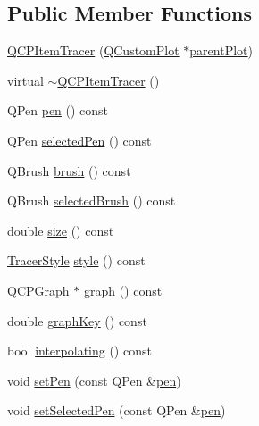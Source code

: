 \subsection*{Public Member Functions}
\begin{DoxyCompactItemize}
\item 
\mbox{\hyperlink{class_q_c_p_item_tracer_adc5ca846eeac323db4aa1fc4081e36be}{Q\+C\+P\+Item\+Tracer}} (\mbox{\hyperlink{class_q_custom_plot}{Q\+Custom\+Plot}} $\ast$\mbox{\hyperlink{class_q_c_p_layerable_a473edb813a4c1929d6b6a8fe3ff3faf7}{parent\+Plot}})
\item 
virtual \mbox{\hyperlink{class_q_c_p_item_tracer_a43686565a9b70815915618636b9bdf0f}{$\sim$\+Q\+C\+P\+Item\+Tracer}} ()
\item 
Q\+Pen \mbox{\hyperlink{class_q_c_p_item_tracer_a789cdc627868f5a4a0956816072571c9}{pen}} () const
\item 
Q\+Pen \mbox{\hyperlink{class_q_c_p_item_tracer_ad231a97bac99e01778618d1a5720b17d}{selected\+Pen}} () const
\item 
Q\+Brush \mbox{\hyperlink{class_q_c_p_item_tracer_a6dd4660e70f58bb00390bcda56be568d}{brush}} () const
\item 
Q\+Brush \mbox{\hyperlink{class_q_c_p_item_tracer_ae3e48270b4a6ec20f7a9e1f63e778243}{selected\+Brush}} () const
\item 
double \mbox{\hyperlink{class_q_c_p_item_tracer_a4e42d7b49f293273a74a49a2457856e2}{size}} () const
\item 
\mbox{\hyperlink{class_q_c_p_item_tracer_a2f05ddb13978036f902ca3ab47076500}{Tracer\+Style}} \mbox{\hyperlink{class_q_c_p_item_tracer_afdaee32c9ccc9c14502b28d3d86bf5ed}{style}} () const
\item 
\mbox{\hyperlink{class_q_c_p_graph}{Q\+C\+P\+Graph}} $\ast$ \mbox{\hyperlink{class_q_c_p_item_tracer_ac6526e3e1fff79894f034823461b138a}{graph}} () const
\item 
double \mbox{\hyperlink{class_q_c_p_item_tracer_ac39a0791109588d11bb97cd643da2470}{graph\+Key}} () const
\item 
bool \mbox{\hyperlink{class_q_c_p_item_tracer_ae9ab6d72e0a35e1769c0b5a9b58181f2}{interpolating}} () const
\item 
void \mbox{\hyperlink{class_q_c_p_item_tracer_af8048636fc1ef0152e51809b008df2ca}{set\+Pen}} (const Q\+Pen \&\mbox{\hyperlink{class_q_c_p_item_tracer_a789cdc627868f5a4a0956816072571c9}{pen}})
\item 
void \mbox{\hyperlink{class_q_c_p_item_tracer_ae1bf70db7f13f928660168cd3e5069f3}{set\+Selected\+Pen}} (const Q\+Pen \&\mbox{\hyperlink{class_q_c_p_item_tracer_a789cdc627868f5a4a0956816072571c9}{pen}})

\end{DoxyCompactItemize}

